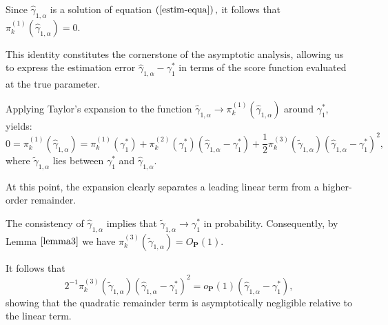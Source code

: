 \documentclass[reqno,openbib,runningheads,a4paper,12pt]{amsart}%
\begin{document}
\noindent Since $\widehat{\gamma}_{1,\alpha}$ is a solution of equation
$\left(  \ref{estim-equa}\right)  ,$ it follows that $\pi_{k}^{\left(
1\right)  }\left(  \widehat{\gamma}_{1,\alpha}\right)  =0.$\textbf{\medskip}

\noindent This identity constitutes the cornerstone of the asymptotic
analysis, allowing us to express the estimation error $\widehat{\gamma
}_{1,\alpha}-\gamma_{1}^{\ast}$ in terms of the score function evaluated at
the true parameter.\textbf{\medskip}

\noindent Applying Taylor's expansion to the function $\widehat{\gamma
}_{1,\alpha}\rightarrow\pi_{k}^{\left(  1\right)  }\left(  \widehat{\gamma
}_{1,\alpha}\right)  $ around $\gamma_{1}^{\ast},$ yields:
\[
0=\pi_{k}^{\left(  1\right)  }\left(  \widehat{\gamma}_{1,\alpha}\right)
=\pi_{k}^{\left(  1\right)  }\left(  \gamma_{1}^{\ast}\right)  +\pi
_{k}^{\left(  2\right)  }\left(  \gamma_{1}^{\ast}\right)  \left(
\widehat{\gamma}_{1,\alpha}-\gamma_{1}^{\ast}\right)  +\frac{1}{2}\pi
_{k}^{\left(  3\right)  }\left(  \widetilde{\gamma}_{1,\alpha}\right)  \left(
\widehat{\gamma}_{1,\alpha}-\gamma_{1}^{\ast}\right)  ^{2},
\]
where $\widetilde{\gamma}_{1,\alpha}$ lies between $\gamma_{1}^{\ast}$ and
$\widehat{\gamma}_{1,\alpha}.$\textbf{\medskip}

\noindent At this point, the expansion clearly separates a leading linear term
from a higher-order remainder.\textbf{\medskip}

\noindent The consistency of $\widehat{\gamma}_{1,\alpha}$ implies that
$\widetilde{\gamma}_{1,\alpha}\rightarrow\gamma_{1}^{\ast}$ in probability.
Consequently, by Lemma $\ref{lemma3}$ we have $\pi_{k}^{\left(  3\right)
}\left(  \widetilde{\gamma}_{1,\alpha}\right)  =O_{\mathbf{P}}\left(
1\right)  .$\textbf{\medskip}

\noindent It follows that
\[
2^{-1}\pi_{k}^{\left(  3\right)  }\left(  \widetilde{\gamma}_{1,\alpha
}\right)  \left(  \widehat{\gamma}_{1,\alpha}-\gamma_{1}^{\ast}\right)
^{2}=o_{\mathbf{P}}\left(  1\right)  \left(  \widehat{\gamma}_{1,\alpha
}-\gamma_{1}^{\ast}\right)  ,
\]
showing that the quadratic remainder term is asymptotically negligible
relative to the linear term. \textbf{\medskip}
\end{document}
